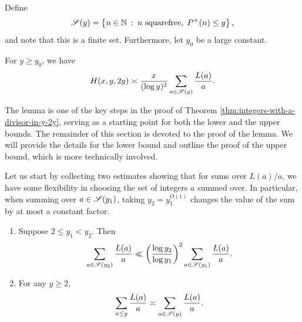 Define
\begin{equation*}
    \mathscr{S}(y) = \left\{ n \in \mathbb{N}\,:\;n \text{ squarefree},  \; P^+(n) \le y\right\},
\end{equation*}
and note that this is a finite set.
Furthermore, let $y_0$ be a large constant.

\begin{lemma}
    \label{lem:global-to-local-principle}
    For $y \ge y_0$, we have
    \begin{equation*}
        H(x, y, 2y) \asymp \frac{x}{(\log y)^2} \sum \limits_{a \in \mathscr{S}(y)} \frac{L(a)}{a}.
    \end{equation*}    
\end{lemma}

The lemma is one of the key steps in the proof of Theorem \ref{thm:integers-with-a-divisor-in-y-2y}, serving as a starting point for both the lower and the upper bounds.
The remainder of this section is devoted to the proof of the lemma.
We will provide the details for the lower bound and outline the proof of the upper bound, which is more technically involved. 

Let us start by collecting two estimates showing that for sums over $L(a)/a$, we have some flexibility in choosing the set of integers $a$ summed over.
In particular, when summing over $a \in \mathscr{S}(y_1)$, taking $y_2 = y_1^{O(1)}$ changes the value of the sum by at most a constant factor.

\begin{lemma} \label{lem:replace-sum-over-a}
    \begin{enumerate}
        \item Suppose $2 \le y_1 < y_2$. Then 
            \begin{equation*}
                \sum \limits_{a \in \mathscr{S}(y_2)} \frac{L(a)}{a} \ll \left( \frac{\log y_2}{\log y_1} \right)^2 \sum \limits_{a \in \mathscr{S}(y_1)}\frac{L(a)}{a}.
            \end{equation*}
        \item For any $y \ge 2$,
            \begin{equation*}
                \sum \limits_{a \le y} \frac{L(a)}{a} \asymp \sum \limits_{a \in \mathscr{S}(y)} \frac{L(a)}{a}.
            \end{equation*}
    \end{enumerate}
\end{lemma}

